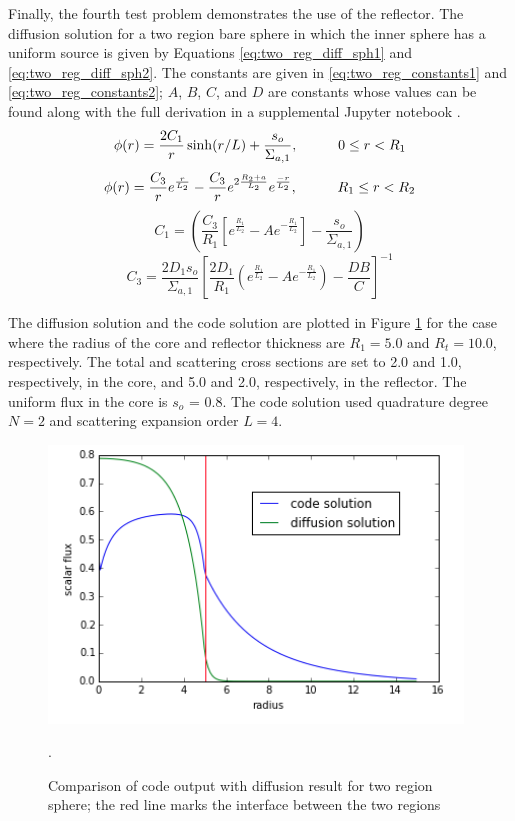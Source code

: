 \documentclass[11pt, oneside]{article}   	%
\newcommand\tab[1][1cm]{\hspace*{#1}}				%
\begin{document}
Finally, the fourth test problem demonstrates the use of the reflector. The diffusion solution for a two region bare sphere in which the inner sphere has a uniform source is given by Equations \ref{eq:two_reg_diff_sph1} and \ref{eq:two_reg_diff_sph2}. The constants are given in \ref{eq:two_reg_constants1} and \ref{eq:two_reg_constants2}; $A$, $B$, $C$, and $D$ are constants whose values can be found along with the full derivation in a supplemental Jupyter notebook \cite{lewis_fundamentals}.
%
\begin{equation}
\begin{aligned}
\phi(r) = \frac{2C_1}{r}\sinh(r/L)+\frac{s_o}{\Sigma_{a,1}}, \tab 0 \le r < R_{1}
\end{aligned}
\label{eq:two_reg_diff_sph1}
\end{equation}
%
\begin{equation}
\phi(r) = \frac{C_3}{r}e^{\frac{r}{L_2}}
-\frac{C_3}{r}e^{2\frac{R_2+a}{L_2}}e^{\frac{-r}{L_2}}, \tab R_1 \le r < R_2
\label{eq:two_reg_diff_sph2}
\end{equation}
%
\begin{equation}
C_1 =\left(\frac{C_3}{R_1}\left[e^{\frac{R_1}{L_2}}-Ae^{-\frac{R_1}{L_2}}\right] - \frac{s_o}{\Sigma_{a,1}}\right)
\label{eq:two_reg_constants1}
\end{equation}
%
\begin{equation}
C_3 = \frac{2 D_1 s_o}{\Sigma_{a,1}}
\left[\frac{2 D_1}{R_1}\left(e^{\frac{R_1}{L_2}}
-Ae^{-\frac{R_1}{L_2}}\right)-\frac{DB}{C} \right]^{-1}
\label{eq:two_reg_constants2}
\end{equation}

The diffusion solution and the code solution are plotted in Figure \ref{fig:refl_soln} for the case where the radius of the core and reflector thickness are $R_1 = 5.0$ and $R_t = 10.0$, respectively. The total and scattering cross sections are set to 2.0 and 1.0, respectively, in the core, and 5.0 and 2.0, respectively, in the reflector. The uniform flux in the core is $s_o$ = 0.8. The code solution used quadrature degree $N=2$ and scattering expansion order $L=4$.
%
\begin{figure}
\centering
\includegraphics[width=11cm]{reflector_result}
\caption{Comparison of code output with diffusion result for two region sphere; the red line marks the interface between the two regions}.
\label{fig:refl_soln}
\end{figure}
\end{document}
